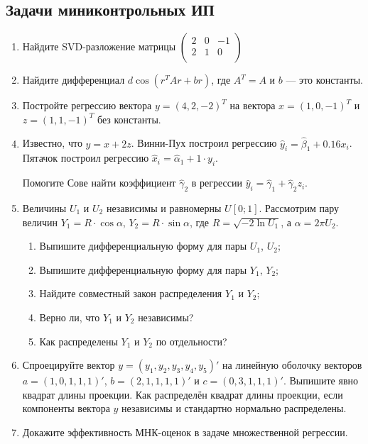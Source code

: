 \subsection{Задачи миниконтрольных ИП}

\begin{enumerate}
  \item Найдите SVD-разложение матрицы $
  \begin{pmatrix}
  2 & 0 & -1 \\
  2 & 1 & 0 \\
  \end{pmatrix}$
 \item Найдите дифференциал $d \cos(r^TAr+br)$, где $A^T=A$ и $b$ — это константы.
 \item Постройте регрессию вектора $y = (4,2,-2)^T$ на вектора $x=(1,0,-1)^T$ и $z=(1,1,-1)^T$
 без константы.
 \item Известно, что $y=x + 2z$. Винни-Пух построил регрессию $\hat y_i = \hat\beta_1 + 0.16 x_i$.
 Пятачок построил регрессию $\hat x_i = \hat \alpha_1 + 1\cdot y_i$.

 Помогите Сове найти коэффициент $\hat \gamma_2$ в регрессии $\hat y_i = \hat\gamma_1 + \hat\gamma_2 z_i$.


\item Величины $U_1$ и $U_2$ независимы и равномерны $U[0;1]$. Рассмотрим пару величин $Y_1 = R\cdot \cos \alpha$, $Y_2 = R\cdot \sin \alpha$, где $R=\sqrt{-2\ln U_1}$, а $\alpha = 2\pi U_2$.
\begin{enumerate}
  \item Выпишите дифференциальную форму для пары $U_1$, $U_2$;
  \item Выпишите дифференциальную форму для пары $Y_1$, $Y_2$;
  \item  Найдите совместный закон распределения $Y_1$ и $Y_2$;
  \item Верно ли, что $Y_1$ и $Y_2$ независимы?
  \item  Как распределены $Y_1$ и $Y_2$ по отдельности?

\end{enumerate}

 \item Спроецируйте вектор $y=(y_1, y_2, y_3, y_4, y_5)'$ на линейную оболочку векторов
 $a=(1, 0, 1,1, 1)'$, $b=(2,1,1,1,1)'$ и $c=(0,3,1,1,1)'$. Выпишите явно квадрат длины
 проекции. Как распределён квадрат длины проекции, если компоненты вектора $y$
 независимы и стандартно нормально распределены.

 \item Докажите эффективность МНК-оценок в задаче множественной регрессии.


\end{enumerate}


